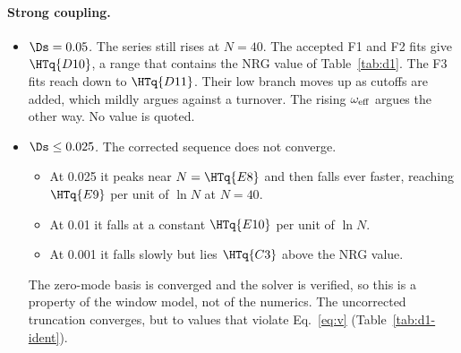 \paragraph{Strong coupling.}
\begin{itemize}
\item \emph{$\Ds=0.05$.} The series still rises at $N=40$. The accepted F1 and F2 fits give $\HTq{D10}$, a range
 that contains the NRG value of Table~\ref{tab:d1}. The F3 fits reach down to $\HTq{D11}$. Their low branch moves up as cutoffs are
 added, which mildly argues against a turnover.
 The rising $\omega_{\rm eff}$ argues the other way. No value is quoted.
\item \emph{$\Ds\le0.025$.} The corrected sequence does not converge.
 \begin{itemize}
 \item At 0.025 it peaks near $N=\HTq{E8}$ and then falls ever faster, reaching $\HTq{E9}$ per unit of $\ln N$ at
 $N=40$.
 \item At 0.01 it falls at a constant $\HTq{E10}$ per unit of $\ln N$.
 \item At 0.001 it falls slowly but lies $\HTq{C3}$ above the NRG value.
 \end{itemize}
 The zero-mode basis is converged and the solver is verified, so this is a property of the window model, not of the
 numerics. The uncorrected truncation converges, but to values that violate Eq.~\eqref{eq:v}
 (Table~\ref{tab:d1-ident}).
\end{itemize}

